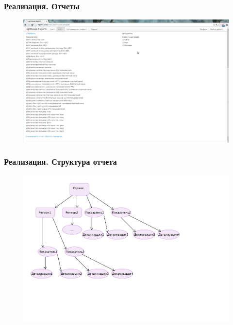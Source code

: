 \documentclass{beamer}
\begin{document}
\begin{frame}
\frametitle{Реализация. Отчеты}
\begin{figure}
\vspace{-0.5cm}
\hspace*{-1cm} \includegraphics[scale=0.26]{../resources/report-indicator.pdf}
\end{figure}
\end{frame}


\begin{frame}
\frametitle{Реализация. Структура отчета}
\begin{figure}
\vspace{-1cm}
\hspace*{-1cm} \includegraphics[scale=0.5]{../resources/uml/ReportScheme.pdf}
\end{figure}
\end{frame}
\end{document}
